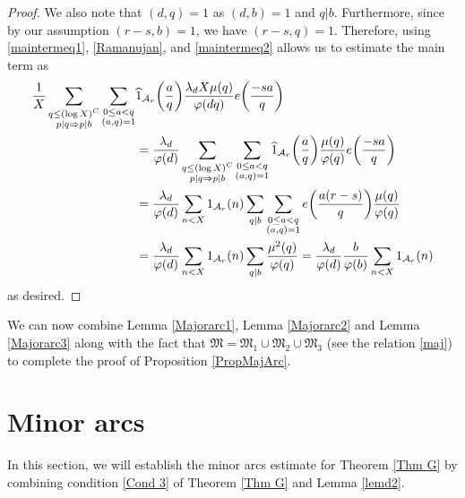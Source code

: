 \documentclass[12pt]{amsart}
\numberwithin{equation}{section}
\theoremstyle{remark}
\theoremstyle{definition}
\begin{document}
\begin{proof}
We also note that $(d, q)=1$ as $(d, b)=1$ and $q|b$. Furthermore, since by our assumption $(r-s, b)=1$, we have $(r-s, q)=1$. Therefore, using  \eqref{maintermeq1}, \eqref{Ramanujan}, and \eqref{maintermeq2} allows us to estimate the main term as
\begin{align}
\notag \dfrac{1}{X}\sum_{\substack{q \leq (\log X)^C\\p|q\Rightarrow p|b}}\sum_{\substack{0\leq a<q\\(a,q)=1}}&\widehat{1}_{\mathcal{A}_r}\bigg(\dfrac{a}{q}\bigg)\dfrac{\lambda_{d} X\mu(q)}{\varphi(dq)}e\bigg(\dfrac{-sa}{q}\bigg)\\
\notag &= \dfrac{\lambda_{d}}{\varphi(d)}\sum_{\substack{q \leq (\log X)^C\\p|q\Rightarrow p|b}}\sum_{\substack{0\leq a<q\\(a,q)=1}}\widehat{1}_{\mathcal{A}_r}\bigg(\dfrac{a}{q}\bigg)\dfrac{\mu(q)}{\varphi(q)}e\bigg(\dfrac{-sa}{q}\bigg)\\
\notag &=\dfrac{\lambda_{d}}{\varphi(d)}\sum_{\substack{n<X}}1_{\mathcal{A}_r}(n)\sum_{\substack{q|b}}\sum_{\substack{0\leq a<q\\(a,q)=1}}e\bigg(\dfrac{a(r-s)}{q}\bigg)\dfrac{\mu(q)}{\varphi(q)}\\
\notag &=\dfrac{\lambda_{d}}{\varphi(d)}\sum_{\substack{n<X}}1_{\mathcal{A}_r}(n)\sum_{q|b}\dfrac{\mu^2(q)}{\varphi(q)}= \dfrac{ \lambda_{d}}{\varphi(d)}\dfrac{b}{\varphi(b)}\sum_{\substack{n<X}}1_{\mathcal{A}_r}(n)
\end{align}
as desired.
\end{proof}

We can now combine Lemma \ref{Majorarc1}, Lemma \ref{Majorarc2} and Lemma \ref{Majorarc3} along with the fact that $\mathfrak{M}=\mathfrak{M}_1\cup\mathfrak{M}_2\cup\mathfrak{M}_3$ (see the relation \eqref{maj}) to complete the proof of Proposition \ref{PropMajArc}.



















\section{Minor arcs}\label{minar1}
In this section, we will establish the minor arcs estimate for Theorem \ref{Thm G} by combining condition \ref{Cond 3} of Theorem \ref{Thm G} and Lemma \ref{lemd2}.
\end{document}
